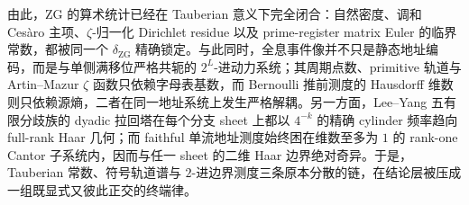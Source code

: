 

\noindent
由此，\(\mathrm{ZG}\) 的算术统计已经在 Tauberian 意义下完全闭合：自然密度、调和 Ces\`aro 主项、\(\zeta\)-归一化 Dirichlet residue 以及 prime-register matrix Euler 的临界常数，都被同一个 \(\delta_{\mathrm{ZG}}\) 精确锁定。与此同时，全息事件像并不只是静态地址编码，而是与单侧满移位严格共轭的 \(2^L\)-进动力系统；其周期点数、primitive 轨道与 Artin--Mazur \(\zeta\) 函数只依赖字母表基数，而 Bernoulli 推前测度的 Hausdorff 维数则只依赖源熵，二者在同一地址系统上发生严格解耦。另一方面，Lee--Yang 五有限分歧族的 dyadic 拉回塔在每个分支 sheet 上都以 \(4^{-k}\) 的精确 cylinder 频率趋向 full-rank Haar 几何；而 faithful 单流地址测度始终困在维数至多为 \(1\) 的 rank-one Cantor 子系统内，因而与任一 sheet 的二维 Haar 边界绝对奇异。于是，Tauberian 常数、符号轨道谱与 \(2\)-进边界测度三条原本分散的链，在结论层被压成一组既显式又彼此正交的终端律。

\endinput
